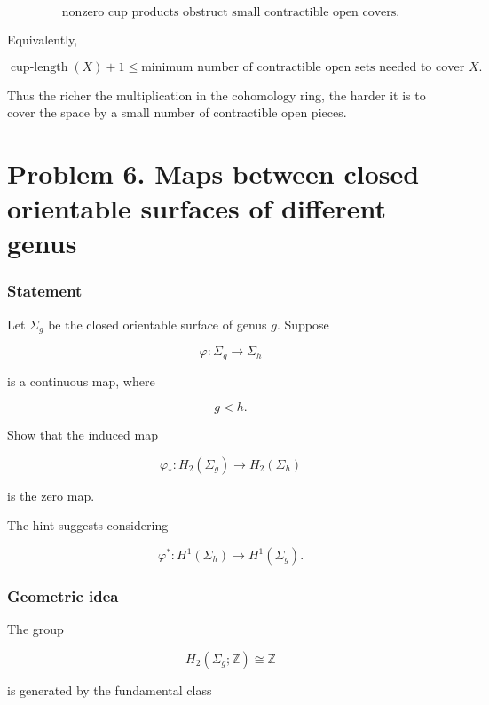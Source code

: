 \documentclass[12pt,a4paper]{article}
\theoremstyle{notespace}
\begin{document}
\[
\boxed{
	\text{nonzero cup products obstruct small contractible open covers.}
}
\]

Equivalently,

\[
\boxed{
	\operatorname{cup\text{-}length}(X)+1
	\leq
	\text{minimum number of contractible open sets needed to cover }X.
}
\]

Thus the richer the multiplication in the cohomology ring, the harder it is to cover the space by a small number of contractible open pieces.


%



\section{Problem 6. Maps between closed orientable surfaces of different genus}

\subsubsection*{Statement}

Let \(\Sigma_g\) be the closed orientable surface of genus \(g\). Suppose

\[
\varphi:\Sigma_g\longrightarrow \Sigma_h
\]

is a continuous map, where

\[
g<h.
\]

Show that the induced map

\[
\varphi_*:H_2(\Sigma_g)\longrightarrow H_2(\Sigma_h)
\]

is the zero map.

The hint suggests considering

\[
\varphi^*:H^1(\Sigma_h)\longrightarrow H^1(\Sigma_g).
\]

\subsubsection*{Geometric idea}

The group

\[
H_2(\Sigma_g;\mathbb Z)\cong \mathbb Z
\]

is generated by the fundamental class
\end{document}
